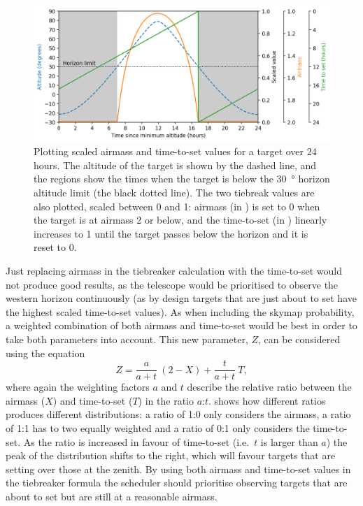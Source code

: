 \begin{colsection}
\begin{figure}[t]
    \begin{center}
        \includegraphics[width=\linewidth]{images/airmass-tts.png}
    \end{center}
    \caption[Plotting scaled airmass and time-to-set values for a target]{
        Plotting scaled airmass and time-to-set values for a target over 24 hours.
        The altitude of the target is shown by the  dashed line, and the  regions show the times when the target is below the \SI{30}{\degree} horizon altitude limit (the black dotted line).
        The two tiebreak values are also plotted, scaled between 0 and 1: airmass (in ) is set to 0 when the target is at airmass 2 or below, and the time-to-set (in ) linearly increases to 1 until the target passes below the horizon and it is reset to 0.
    }\label{fig:airmass_tts}
\end{figure}

Just replacing airmass in the tiebreaker calculation with the time-to-set would not produce good results, as the telescope would be prioritised to observe the western horizon continuously (as by design targets that are just about to set have the highest scaled time-to-set values). As when including the skymap probability, a weighted combination of both airmass and time-to-set would be best in order to take both parameters into account. This new parameter, $Z$, can be considered using the equation
%
\begin{equation}
    Z = \frac{a}{a+t}~(2-X) + \frac{t}{a+t}~T,
    \label{eq:at_ratio}
\end{equation}
%
where again the weighting factors $a$ and $t$ describe the relative ratio between the airmass ($X$) and time-to-set ($T$) in the ratio $a$:$t$.  shows how different ratios produces different distributions: a ratio of 1:0 only considers the airmass, a ratio of 1:1 has to two equally weighted and a ratio of 0:1 only considers the time-to-set. As the ratio is increased in favour of time-to-set (i.e.\ $t$ is larger than $a$) the peak of the distribution shifts to the right, which will favour targets that are setting over those at the zenith. By using both airmass and time-to-set values in the tiebreaker formula the scheduler should prioritise observing targets that are about to set but are still at a reasonable airmass.


\end{colsection}
